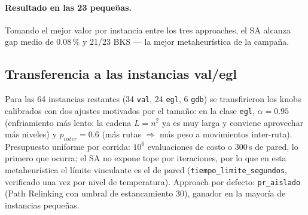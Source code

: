 \paragraph{Resultado en las 23 pequeñas.} Tomando el mejor valor por instancia
entre los tres approaches, el SA alcanza gap medio de $0.08\,\%$ y 21/23 BKS
--- la mejor metaheurística de la campaña.

\subsection{Transferencia a las instancias val/egl}
Para las 64 instancias restantes (34 \texttt{val}, 24 \texttt{egl}, 6
\texttt{gdb}) se transfirieron los knobs calibrados con dos ajustes motivados
por el tamaño: en la clase \texttt{egl}, $\alpha = 0.95$ (enfriamiento más
lento: la cadena $L = n^2$ ya es muy larga y conviene aprovechar más niveles) y
$p_{inter} = 0.6$ (más rutas $\Rightarrow$ más peso a movimientos inter-ruta).
Presupuesto uniforme por corrida: $10^6$ evaluaciones de costo o 300\,s de
pared, lo primero que ocurra; el SA no expone tope por iteraciones, por lo que
en esta metaheurística el límite vinculante es el de pared
(\texttt{tiempo\_limite\_segundos}, verificado una vez por nivel de
temperatura). Approach por defecto: \texttt{pr\_aislado} (Path Relinking con
umbral de estancamiento 30), ganador en la mayoría de instancias pequeñas.
